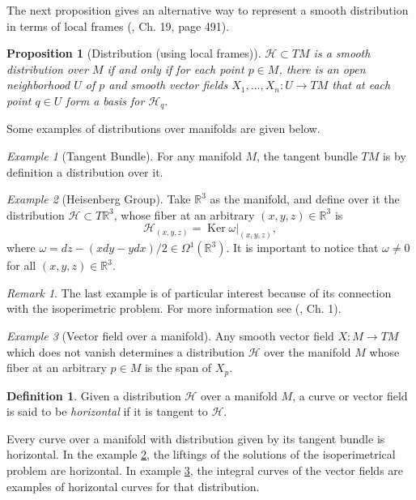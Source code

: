 \documentclass[12pt, letterpaper, reqno]{amsart}
\theoremstyle{definition}
\newtheorem{df}{Definition}
\theoremstyle{plain}
\newtheorem{prop}{Proposition}
\theoremstyle{remark}
\newtheorem{ex}{Example}
\newtheorem{rem}{Remark}
\begin{document}
The next proposition gives an alternative way to represent a smooth distribution in terms of local frames (\cite{lee2003introduction}, Ch. 19, page 491).

\begin{prop} [Distribution (using local frames)]
	$ \mathcal{H}\subset TM $ is a smooth distribution over $M  $ if and only if  for each point $ p\in M $, there is an open neighborhood $ U $ of $ p $  and smooth vector fields $ X_1,\dots,X_n: U \rightarrow {TM} $ that at each point  $ q\in U $ form a basis for $ \mathcal{H}_q. $ 
\end{prop}
Some examples of distributions over manifolds are given below.
\begin{ex}[Tangent Bundle]
	For any manifold $ M $, the tangent bundle $ TM $ is by definition a distribution over it. 
\end{ex}
\begin{ex}[Heisenberg Group]\label{ex:heis_group}
	Take $ \mathbb{R} ^3 $ as the manifold, and define over it the distribution $ \mathcal{H}\subset T \mathbb{R} ^3 $, whose fiber at an arbitrary $ (x,y,z)\in \mathbb{R}^3  $ is   
	$$ \mathcal{H}_{(x,y,z)} = \operatorname{Ker} \omega|_{(x,y,z)},$$
	where $ \omega = dz-(x dy-y dx)/2\in\Omega^1( \mathbb{R}^3).$ It is important to notice that $ \omega\neq 0 $ for all $ (x,y,z)\in \mathbb{R}^3. $ 
\end{ex}
\begin{rem}
	The last example is of particular interest because of its connection with the isoperimetric problem. For more information see (\cite{montgomery2002tour}, Ch. 1).
\end{rem}
\begin{ex}[Vector field over a manifold]\label{ex:vect_field}
Any smooth vector field $ X: M \rightarrow {TM} $ which does not vanish  determines a distribution $ \mathcal{H}$ over the manifold $ M $ whose fiber at an arbitrary $ p\in M $ is the span of $ X_p. $
\end{ex}

\begin{df}\label{def:horizontal_things}
	Given a distribution $ \mathcal{H} $  over a manifold $M$,  a curve or vector field is said to be \textit{horizontal} if it is tangent to $ \mathcal{H} $.
\end{df}

Every curve over a manifold with distribution given by its tangent bundle is horizontal. In the example \ref{ex:heis_group}, the liftings of the solutions of the isoperimetrical problem are horizontal. In example \ref{ex:vect_field}, the integral curves of the vector fields are examples of horizontal curves for that distribution.
\end{document}
